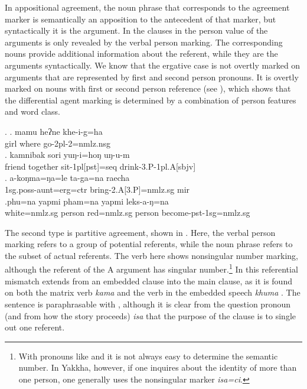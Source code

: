 In appositional agreement, the noun phrase that corresponds to the agreement marker is semantically an apposition to the antecedent of that marker, but syntactically it is the argument. In the clauses in \Next the person value of the arguments is only revealed by the verbal person marking. The corresponding nouns provide additional information about the referent, while  they are the arguments syntactically. We know that the ergative case is not overtly marked on arguments that are represented by first and second person pronouns. It is overtly marked on nouns with first or second person reference (see \Next[c]), which shows that the differential agent marking is determined by a combination of person features and word class.

\ex.  \ag. mamu heʔne khe-i-g=ha\label{verb-infl-example}\\
		girl where go{\sc [pst]-2pl-2=nmlz.nsg}\\
	\bg.  kamnibak sori yuŋ-i=hoŋ uŋ-u-m\\
		friend together sit{\sc -1pl[pst]=seq} drink{\sc -3.P-1pl.A[sbjv]}\\
	\bg. a-koŋma=ŋa=le   ta-ga=na           raecha\\
		{\sc 1sg.poss-}aunt{\sc =erg=ctr} bring{\sc [pst]-2.A[3.P]=nmlz.sg} {\sc mir} \\
		 
		\bg.phu=na yapmi pham=na yapmi leks-a-ŋ=na\\
		white{\sc =nmlz.sg} person red{\sc =nmlz.sg} person become{\sc -pst-1sg=nmlz.sg}\\
 
 
 The second type is partitive agreement, shown in \Next. Here, the verbal person marking refers to a group of potential referents, while the noun phrase refers to the subset of actual referents. The verb here shows nonsingular number marking, although the referent of the A argument has singular number.\footnote{With pronouns like  and  it is not always easy to determine the semantic number. In Yakkha, however, if one inquires about the identity of more than one person, one generally uses the nonsingular marker \emph{isa=ci}.}  In \Next[b] this referential mismatch extends from an embedded clause into the main clause, as it is found on both the matrix verb \emph{kama}  and the verb in the embedded speech \emph{khuma} . The sentence is paraphrasable with , although it is clear from the question pronoun (and from how the story proceeds) \emph{isa}  that the purpose of the clause is to single out one referent.
  
